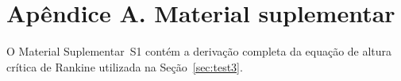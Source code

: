 \documentclass[preprint,review,12pt,authoryear]{elsarticle}
\begin{document}
\section*{Apêndice A. Material suplementar}

O Material Suplementar~S1 contém a derivação completa da equação de altura crítica de Rankine utilizada na Seção~\ref{sec:test3}.



\end{document}
